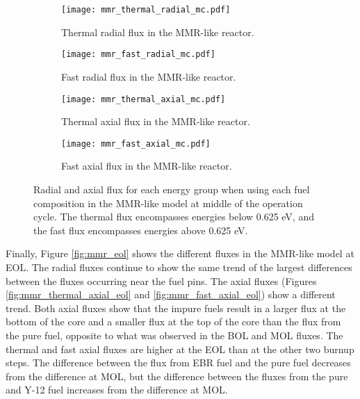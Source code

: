 \begin{figure}[h!]
        \centering
        \begin{subfigure}[b]{0.48\textwidth}
            \centering
            \texttt{[image: mmr\_thermal\_radial\_mc.pdf]}
            \caption{Thermal radial flux in the \gls{MMR}-like reactor.}
            \label{fig:mmr_thermal_radial_mc}
        \end{subfigure}
        \hfill
        \begin{subfigure}[b]{0.48\textwidth}
            \centering
            \texttt{[image: mmr\_fast\_radial\_mc.pdf]}
            \caption{Fast radial flux in the \gls{MMR}-like reactor.}
            \label{fig:mmr_fast_radial_mc}
        \end{subfigure}
        \hfill
            
        \begin{subfigure}[b]{0.48\textwidth}
            \centering
            \texttt{[image: mmr\_thermal\_axial\_mc.pdf]}
            \caption{Thermal axial flux in the \gls{MMR}-like reactor. }
            \label{fig:mmr_thermal_axial_mc}
        \end{subfigure}
        \hfill
        \begin{subfigure}[b]{0.48\textwidth}
            \centering
            \texttt{[image: mmr\_fast\_axial\_mc.pdf]}
            \caption{Fast axial flux in the \gls{MMR}-like reactor.}
            \label{fig:mmr_fast_axial_mc}
        \end{subfigure}
        \hfill
        \caption{Radial and axial flux for each energy group when using 
        each fuel composition in the \gls{MMR}-like model at middle of 
        the operation cycle. The thermal flux encompasses energies below 
        0.625 eV, and the 
        fast flux encompasses energies above 0.625 eV.}
        \label{fig:mmr_mc}
   \end{figure}

Finally, Figure \ref{fig:mmr_eol} shows the different fluxes in the 
\gls{MMR}-like model at \gls{EOL}. The radial fluxes continue to show 
the same trend of the largest differences between the fluxes occurring near
the fuel pins. The axial fluxes (Figures \ref{fig:mmr_thermal_axial_eol} and 
\ref{fig:mmr_fast_axial_eol}) show a different trend. Both axial 
fluxes show that the impure fuels result in a larger flux at the 
bottom of the core and a smaller flux at the top of the core than the flux 
from the pure fuel, opposite
to what was observed in the \gls{BOL} and \gls{MOL} fluxes. The thermal 
and fast axial fluxes are higher at the \gls{EOL} than at the other 
two burnup steps. The difference between the flux from \gls{EBR} fuel 
and the pure fuel decreases from the difference at \gls{MOL}, but the 
difference between the fluxes from the pure and Y-12 fuel 
increases from the difference at \gls{MOL}. 
   
